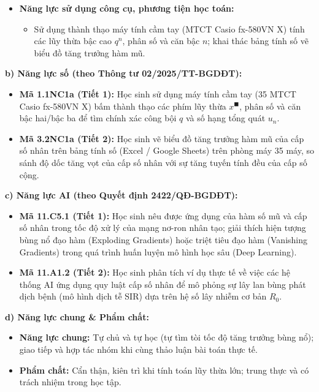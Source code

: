 \documentclass[12pt, a4paper]{article}
\begin{document}
\begin{itemize}[leftmargin=1.5em]
\begin{itemize}
        \item Sử dụng chính xác các thuật ngữ: cấp số nhân, công bội, số hạng tổng quát, tổng $n$ số hạng đầu; phân biệt rạch ròi giữa cấp số cộng (tăng trưởng theo phép cộng - tuyến tính) và cấp số nhân (tăng trưởng theo phép nhân - hàm mũ).
    \end{itemize}
    \item \textbf{Năng lực sử dụng công cụ, phương tiện học toán:}
    \begin{itemize}
        \item Sử dụng thành thạo máy tính cầm tay (MTCT Casio fx-580VN X) tính các lũy thừa bậc cao $q^n$, phân số và căn bậc $n$; khai thác bảng tính số vẽ biểu đồ tăng trưởng hàm mũ.
    \end{itemize}
\end{itemize}


\textbf{b) Năng lực số (theo Thông tư 02/2025/TT-BGDĐT):}
\begin{itemize}[leftmargin=1.5em]
    \item \textbf{Mã 1.1NC1a (Tiết 1):} Học sinh sử dụng máy tính cầm tay (35 MTCT Casio fx-580VN X) bấm thành thạo các phím lũy thừa $x^\blacksquare$, phân số và căn bậc hai/bậc ba để tìm chính xác công bội $q$ và số hạng tổng quát $u_n$.
    \item \textbf{Mã 3.2NC1a (Tiết 2):} Học sinh vẽ biểu đồ tăng trưởng hàm mũ của cấp số nhân trên bảng tính số (Excel / Google Sheets) trên phòng máy 35 máy, so sánh độ dốc tăng vọt của cấp số nhân với sự tăng tuyến tính đều của cấp số cộng.
\end{itemize}


\textbf{c) Năng lực AI (theo Quyết định 2422/QĐ-BGDĐT):}
\begin{itemize}[leftmargin=1.5em]
    \item \textbf{Mã 11.C5.1 (Tiết 1):} Học sinh nêu được ứng dụng của hàm số mũ và cấp số nhân trong tốc độ xử lý của mạng nơ-ron nhân tạo; giải thích hiện tượng bùng nổ đạo hàm (Exploding Gradients) hoặc triệt tiêu đạo hàm (Vanishing Gradients) trong quá trình huấn luyện mô hình học sâu (Deep Learning).
    \item \textbf{Mã 11.A1.2 (Tiết 2):} Học sinh phân tích ví dụ thực tế về việc các hệ thống AI ứng dụng quy luật cấp số nhân để mô phỏng sự lây lan bùng phát dịch bệnh (mô hình dịch tễ SIR) dựa trên hệ số lây nhiễm cơ bản $R_0$.
\end{itemize}


\textbf{d) Năng lực chung \& Phẩm chất:}
\begin{itemize}[leftmargin=1.5em]
    \item \textbf{Năng lực chung:} Tự chủ và tự học (tự tìm tòi tốc độ tăng trưởng bùng nổ); giao tiếp và hợp tác nhóm khi cùng thảo luận bài toán thực tế.
    \item \textbf{Phẩm chất:} Cẩn thận, kiên trì khi tính toán lũy thừa lớn; trung thực và có trách nhiệm trong học tập.
\end{itemize}
\end{document}
